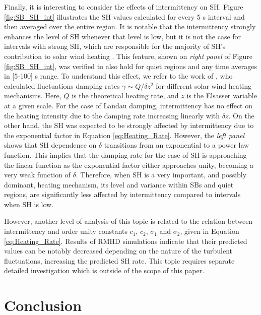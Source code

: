 \documentclass[]{aastex62}
\begin{document}
Finally, it is interesting to consider the effects of intermittency on SH. Figure \ref{fig:SB_SH_int} illustrates the SH values calculated for every 5 s interval and then averaged over the entire region. It is notable that the intermittency strongly enhances the level of SH whenever that level is low, but it is not the case for intervals with strong SH, which are responsible for the majority of SH's contribution to solar wind heating \citep{Martinovic_2019_ApJ,Martinovic_2020_ApJS}. This feature, shown on \emph{right panel} of Figure \ref{fig:SB_SH_int}, was verified to also hold for quiet regions and any time averages in [5-100] s range. To understand this effect, we refer to the work of \cite{Mallet_2019_JPP}, who calculated fluctuations damping rates $\gamma \sim Q / \delta z^2$ for different solar wind heating mechanisms. Here, $Q$ is the theoretical heating rate, and $z$ is the Elsasser variable \citep{Elsasser_1950_PhRv} at a given scale. For the case of Landau damping, intermittency has no effect on the heating intensity due to the damping rate increasing linearly with $\delta z$. On the other hand, the SH was expected to be strongly affected by intermittency due to the exponential factor in Equation \ref{eq:Heating_Rate}. However, the \emph{left panel} shows that SH dependence on $\delta$ transitions from an exponential to a power law function. This implies that the damping rate for the case of SH is approaching the linear function as the exponential factor either approaches unity, becoming a very weak function of $\delta$. Therefore, when SH is a very important, and possibly dominant, heating mechanism, its level and variance within SBs and quiet regions, are significantly less affected by intermittency compared to intervals when SH is low. 

However, another level of analysis of this topic is related to the relation between intermittency and order unity constants $c_1$, $c_2$, $\sigma_1$ and $\sigma_2$, given in Equation \ref{eq:Heating_Rate}. Results of RMHD simulations \citep{Xia_2013} indicate that their predicted values can be notably decreased depending on the nature of the turbulent fluctuations, increasing the predicted SH rate. This topic requires separate detailed investigation which is outside of the scope of this paper.



\section{Conclusion}
\label{sec:Conclusion}
\end{document}
